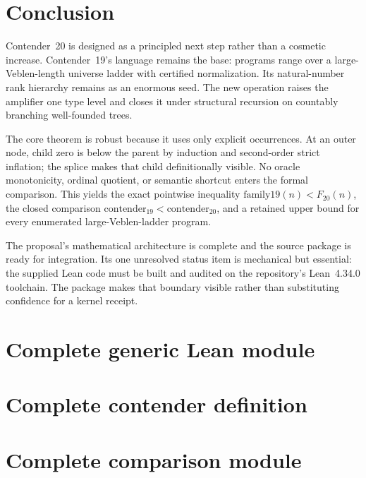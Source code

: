 \documentclass[11pt]{article}
\theoremstyle{definition}
\theoremstyle{remark}
\begin{document}
\section{Conclusion}

Contender~20 is designed as a principled next step rather than a cosmetic
increase.  Contender~19's language remains the base: programs range over a
large-Veblen-length universe ladder with certified normalization.  Its
natural-number rank hierarchy remains as an enormous seed.  The new operation
raises the amplifier one type level and closes it under structural recursion on
countably branching well-founded trees.

The core theorem is robust because it uses only explicit occurrences.  At an
outer node, child zero is below the parent by induction and second-order strict
inflation; the splice makes that child definitionally visible.  No oracle
monotonicity, ordinal quotient, or semantic shortcut enters the formal
comparison.  This yields the exact pointwise inequality
\(\mathrm{family19}(n)<F_{20}(n)\), the closed comparison
\(\mathrm{contender}_{19}<\mathrm{contender}_{20}\), and a retained upper bound
for every enumerated large-Veblen-ladder program.

The proposal's mathematical architecture is complete and the source package is
ready for integration.  Its one unresolved status item is mechanical but
essential: the supplied Lean code must be built and audited on the repository's
Lean~4.34.0 toolchain.  The package makes that boundary visible rather than
substituting confidence for a kernel receipt.

\appendix
\section{Complete generic Lean module}



\section{Complete contender definition}



\section{Complete comparison module}
\end{document}
